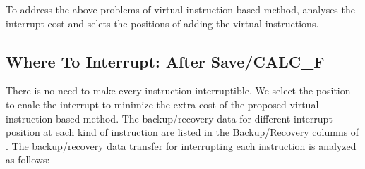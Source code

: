 To address the above problems of virtual-instruction-based method,  analyses the interrupt cost and selets the positions of adding the virtual instructions.





\subsection{ Where To Interrupt: After Save/CALC\_F }
\label{sec:whereinter}

There is no need to make every instruction interruptible. We select the position to enale the interrupt to minimize the extra cost of the proposed virtual-instruction-based method. The backup/recovery data for different interrupt position at each kind of instruction are listed in the Backup/Recovery columns of . The backup/recovery data transfer for interrupting each instruction is analyzed as follows:

